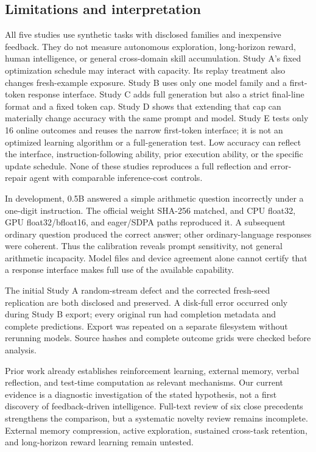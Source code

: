 \documentclass[11pt]{article}
\begin{document}
\subsection{Limitations and interpretation}
All five studies use synthetic tasks with disclosed families and inexpensive
feedback. They do not measure autonomous exploration, long-horizon reward,
human intelligence, or general cross-domain skill accumulation. Study A's
fixed optimization schedule may interact with capacity. Its replay treatment
also changes fresh-example exposure. Study B uses only one model family and
a first-token response interface. Study C adds full generation but also a
strict final-line format and a fixed token cap. Study D shows that extending that cap can materially
change accuracy with the same prompt and model. Study E tests only 16 online
outcomes and reuses the narrow first-token interface; it is not an optimized
learning algorithm or a full-generation test. Low accuracy can reflect the
interface, instruction-following ability, prior execution ability, or the
specific update schedule. None of these studies reproduces a full reflection
and error-repair agent with comparable inference-cost controls.

In development, 0.5B answered a simple arithmetic question incorrectly under
a one-digit instruction. The official weight SHA-256 matched, and CPU float32,
GPU float32/bfloat16, and eager/SDPA paths reproduced it. A subsequent ordinary
question produced the correct answer; other ordinary-language responses were
coherent. Thus the calibration reveals prompt sensitivity, not general
arithmetic incapacity. Model files and device agreement alone cannot certify
that a response interface makes full use of the available capability.

The initial Study A random-stream defect and the corrected fresh-seed
replication are both disclosed and preserved. A disk-full error occurred only
during Study B export; every original run had completion metadata and complete
predictions. Export was repeated on a separate filesystem without rerunning
models. Source hashes and complete outcome grids were checked before analysis.

Prior work already establishes reinforcement learning, external memory,
verbal reflection, and test-time computation as relevant mechanisms. Our
current evidence is a diagnostic investigation of the stated hypothesis, not
a first discovery of feedback-driven intelligence. Full-text review of six
close precedents strengthens the comparison, but a systematic novelty review
remains incomplete. External memory compression, active exploration, sustained
cross-task retention, and long-horizon reward learning remain untested.
\end{document}

